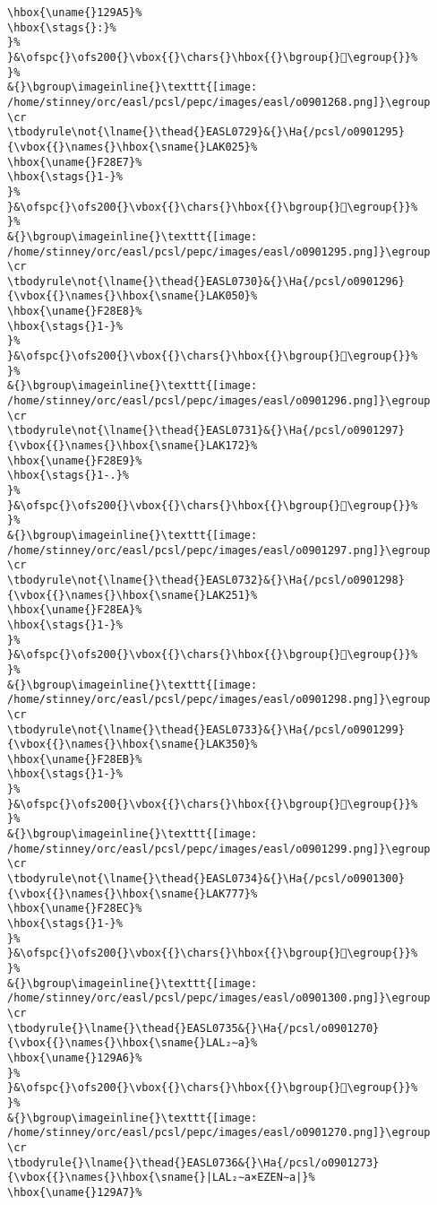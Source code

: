 \begin{verbatim}
\hbox{\uname{}129A5}%
\hbox{\stags{}:}%
}%
}&\ofspc{}\ofs200{}\vbox{{}\chars{}\hbox{{}\bgroup{}𒦥\egroup{}}%
}%
&{}\bgroup\imageinline{}\texttt{[image: /home/stinney/orc/easl/pcsl/pepc/images/easl/o0901268.png]}\egroup
\cr
\tbodyrule\not{\lname{}\thead{}EASL0729}&{}\Ha{/pcsl/o0901295}{\vbox{{}\names{}\hbox{\sname{}LAK025}%
\hbox{\uname{}F28E7}%
\hbox{\stags{}1-}%
}%
}&\ofspc{}\ofs200{}\vbox{{}\chars{}\hbox{{}\bgroup{}󲣧\egroup{}}%
}%
&{}\bgroup\imageinline{}\texttt{[image: /home/stinney/orc/easl/pcsl/pepc/images/easl/o0901295.png]}\egroup
\cr
\tbodyrule\not{\lname{}\thead{}EASL0730}&{}\Ha{/pcsl/o0901296}{\vbox{{}\names{}\hbox{\sname{}LAK050}%
\hbox{\uname{}F28E8}%
\hbox{\stags{}1-}%
}%
}&\ofspc{}\ofs200{}\vbox{{}\chars{}\hbox{{}\bgroup{}󲣨\egroup{}}%
}%
&{}\bgroup\imageinline{}\texttt{[image: /home/stinney/orc/easl/pcsl/pepc/images/easl/o0901296.png]}\egroup
\cr
\tbodyrule\not{\lname{}\thead{}EASL0731}&{}\Ha{/pcsl/o0901297}{\vbox{{}\names{}\hbox{\sname{}LAK172}%
\hbox{\uname{}F28E9}%
\hbox{\stags{}1-.}%
}%
}&\ofspc{}\ofs200{}\vbox{{}\chars{}\hbox{{}\bgroup{}󲣩\egroup{}}%
}%
&{}\bgroup\imageinline{}\texttt{[image: /home/stinney/orc/easl/pcsl/pepc/images/easl/o0901297.png]}\egroup
\cr
\tbodyrule\not{\lname{}\thead{}EASL0732}&{}\Ha{/pcsl/o0901298}{\vbox{{}\names{}\hbox{\sname{}LAK251}%
\hbox{\uname{}F28EA}%
\hbox{\stags{}1-}%
}%
}&\ofspc{}\ofs200{}\vbox{{}\chars{}\hbox{{}\bgroup{}󲣪\egroup{}}%
}%
&{}\bgroup\imageinline{}\texttt{[image: /home/stinney/orc/easl/pcsl/pepc/images/easl/o0901298.png]}\egroup
\cr
\tbodyrule\not{\lname{}\thead{}EASL0733}&{}\Ha{/pcsl/o0901299}{\vbox{{}\names{}\hbox{\sname{}LAK350}%
\hbox{\uname{}F28EB}%
\hbox{\stags{}1-}%
}%
}&\ofspc{}\ofs200{}\vbox{{}\chars{}\hbox{{}\bgroup{}󲣫\egroup{}}%
}%
&{}\bgroup\imageinline{}\texttt{[image: /home/stinney/orc/easl/pcsl/pepc/images/easl/o0901299.png]}\egroup
\cr
\tbodyrule\not{\lname{}\thead{}EASL0734}&{}\Ha{/pcsl/o0901300}{\vbox{{}\names{}\hbox{\sname{}LAK777}%
\hbox{\uname{}F28EC}%
\hbox{\stags{}1-}%
}%
}&\ofspc{}\ofs200{}\vbox{{}\chars{}\hbox{{}\bgroup{}󲣬\egroup{}}%
}%
&{}\bgroup\imageinline{}\texttt{[image: /home/stinney/orc/easl/pcsl/pepc/images/easl/o0901300.png]}\egroup
\cr
\tbodyrule{}\lname{}\thead{}EASL0735&{}\Ha{/pcsl/o0901270}{\vbox{{}\names{}\hbox{\sname{}LAL₂∼a}%
\hbox{\uname{}129A6}%
}%
}&\ofspc{}\ofs200{}\vbox{{}\chars{}\hbox{{}\bgroup{}𒦦\egroup{}}%
}%
&{}\bgroup\imageinline{}\texttt{[image: /home/stinney/orc/easl/pcsl/pepc/images/easl/o0901270.png]}\egroup
\cr
\tbodyrule{}\lname{}\thead{}EASL0736&{}\Ha{/pcsl/o0901273}{\vbox{{}\names{}\hbox{\sname{}|LAL₂∼a×EZEN∼a|}%
\hbox{\uname{}129A7}%

\end{verbatim}
